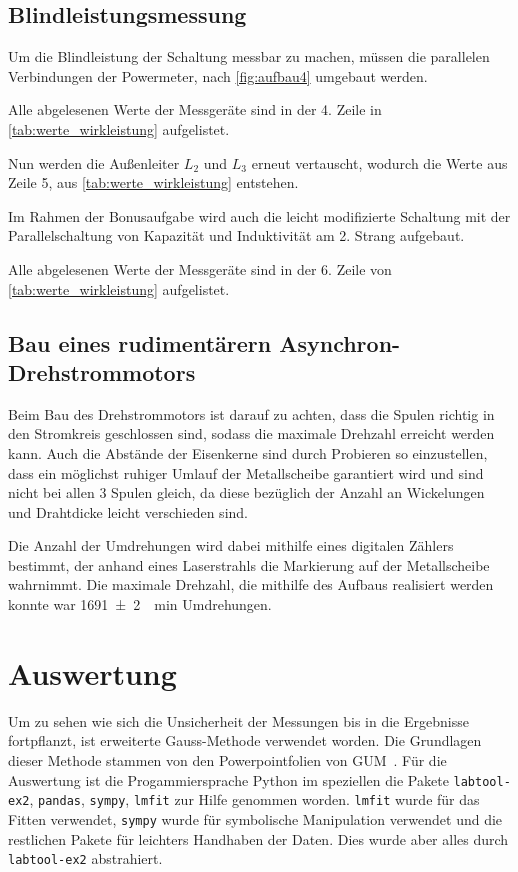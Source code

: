 \documentclass[12pt,english,ngerman]{scrartcl}
\begin{document}
\subsection{Blindleistungsmessung}

Um die Blindleistung der Schaltung messbar zu machen, müssen die parallelen
Verbindungen der Powermeter, nach \autoref{fig:aufbau4} umgebaut werden.

Alle abgelesenen Werte der Messgeräte sind in der 4. Zeile in
\autoref{tab:werte_wirkleistung} aufgelistet.

Nun werden die Außenleiter $L_2$ und $L_3$ erneut vertauscht, wodurch die Werte
aus Zeile 5, aus \autoref{tab:werte_wirkleistung} entstehen.

Im Rahmen der Bonusaufgabe wird auch die leicht modifizierte Schaltung mit der
Parallelschaltung von Kapazität und Induktivität am 2. Strang aufgebaut.

Alle abgelesenen Werte der Messgeräte sind in der 6. Zeile von
\autoref{tab:werte_wirkleistung} aufgelistet.

\subsection{Bau eines rudimentärern Asynchron-Drehstrommotors}

Beim Bau des Drehstrommotors ist darauf zu achten, dass die Spulen richtig in
den Stromkreis geschlossen sind, sodass die maximale Drehzahl erreicht werden
kann. Auch die Abstände der Eisenkerne sind durch Probieren so einzustellen,
dass ein möglichst ruhiger Umlauf der Metallscheibe garantiert wird und sind
nicht bei allen 3 Spulen gleich, da diese bezüglich der Anzahl an Wickelungen
und Drahtdicke leicht verschieden sind.

Die Anzahl der Umdrehungen wird dabei mithilfe eines digitalen Zählers
bestimmt, der anhand eines Laserstrahls die Markierung auf der Metallscheibe
wahrnimmt. Die maximale Drehzahl, die mithilfe des Aufbaus realisiert werden
konnte war \SI{1691(2)}{\per\minute} Umdrehungen.

\section{Auswertung}\label{sec:auswertung}

Um zu sehen wie sich die Unsicherheit der Messungen bis in die Ergebnisse
fortpflanzt, ist erweiterte Gauss-Methode verwendet worden. Die Grundlagen
dieser Methode stammen von den Powerpointfolien von
GUM~\cite{wolfgang_kessel_isobipm-gum_2004}. Für die Auswertung ist die
Progammiersprache Python im speziellen die Pakete \verb#labtool-ex2#,
\verb#pandas#, \verb#sympy#, \verb#lmfit# zur Hilfe genommen worden.
\verb#lmfit# wurde für das Fitten verwendet, \verb#sympy# wurde für
symbolische Manipulation verwendet und die restlichen Pakete für leichters
Handhaben der Daten. Dies wurde aber alles durch \verb#labtool-ex2#
abstrahiert.
\end{document}
